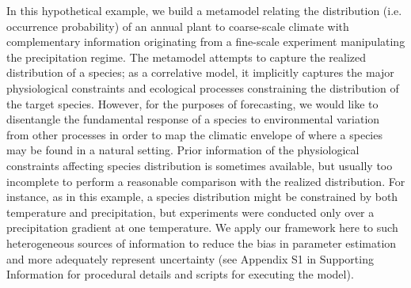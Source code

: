 \documentclass[11pt]{article}
\begin{document}
In this hypothetical example, we build a metamodel relating the distribution (i.e. occurrence probability) of an annual plant to coarse-scale climate with complementary information originating from a fine-scale experiment manipulating the precipitation regime.
The metamodel attempts to capture the realized distribution of a species; as a correlative model, it implicitly captures the major physiological constraints and ecological processes constraining the distribution of the target species. 
However, for the purposes of forecasting, we would like to disentangle the fundamental response of a species to environmental variation from other processes in order to map the climatic envelope of where a species may be found in a natural setting. 
Prior information of the physiological constraints affecting species distribution is sometimes available, but usually too incomplete to perform a reasonable comparison with the realized distribution.
For instance, as in this example, a species distribution might be constrained by both temperature and precipitation, but experiments were conducted only over a precipitation gradient at one temperature. 
We apply our framework here to such heterogeneous sources of information to reduce the bias in parameter estimation and more adequately represent uncertainty (see Appendix S1 in Supporting Information for procedural details and scripts for executing the model).
\end{document}
